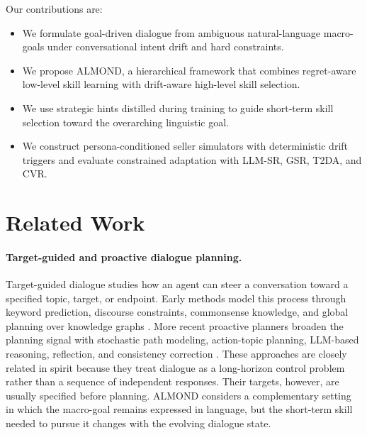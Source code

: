 \documentclass[conference]{IEEEtran}
\begin{document}
Our contributions are:
\begin{itemize}
    \item We formulate goal-driven dialogue from ambiguous natural-language
    macro-goals under conversational intent drift and hard constraints.
    \item We propose ALMOND, a hierarchical framework that combines
    regret-aware low-level skill learning with drift-aware high-level skill
    selection.
    \item We use strategic hints distilled during training to guide short-term
    skill selection toward the overarching linguistic goal.
    \item We construct persona-conditioned seller simulators with deterministic
    drift triggers and evaluate constrained adaptation with LLM-SR, GSR, T2DA,
    and CVR.
\end{itemize}

\section{Related Work}

\paragraph{Target-guided and proactive dialogue planning.}
Target-guided dialogue studies how an agent can steer a conversation toward a
specified topic, target, or endpoint. Early methods model this process through
keyword prediction, discourse constraints, commonsense knowledge, and global
planning over knowledge graphs
\cite{tang-etal-2019-target,qin2020dynamic,zhong2021keyword,kishinami-etal-2022-target,yang-etal-2022-topkg}.
More recent proactive planners broaden the planning signal with stochastic path
modeling, action-topic planning, LLM-based reasoning, reflection, and
consistency correction
\cite{wang-etal-2023-dialogue,wang2024target,zheng-etal-2024-thoughts,guo-etal-2024-pcqpr,zhang-etal-2025-enhancing-goal}.
These approaches are closely related in spirit because they treat dialogue as a
long-horizon control problem rather than a sequence of independent responses.
Their targets, however, are usually specified before planning. ALMOND considers
a complementary setting in which the macro-goal remains expressed in language,
but the short-term skill needed to pursue it changes with the evolving dialogue
state.
\end{document}
